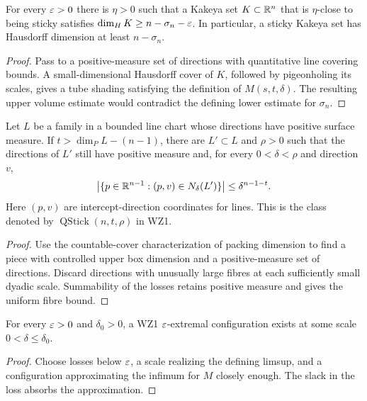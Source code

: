 \begin{proposition}
\label{prop:wz1-dimension-reduction}
For every $\varepsilon>0$ there is $\eta>0$ such that a Kakeya set
$K\subset\mathbb{R}^n$ that is $\eta$-close to being sticky satisfies
$\dim_H K\geq n-\sigma_n-\varepsilon$. In particular, a sticky Kakeya set
has Hausdorff dimension at least $n-\sigma_n$.
\end{proposition}
\begin{proof}
Pass to a positive-measure set of directions with quantitative line
covering bounds. A small-dimensional Hausdorff cover of $K$, followed
by pigeonholing its scales, gives a tube shading satisfying the
definition of $M(s,t,\delta)$. The resulting upper volume estimate
would contradict the defining lower estimate for $\sigma_n$.
\end{proof}

\begin{lemma}
\label{lem:packing-to-stickiness}
Let $L$ be a family in a bounded line chart whose directions have
positive surface measure. If $t>\dim_P L-(n-1)$, there are
$L'\subset L$ and $\rho>0$ such that the directions of $L'$ still
have positive measure and, for every $0<\delta<\rho$ and direction
$v$,
\[
 \left|\{p\in\mathbb{R}^{n-1}:(p,v)\in N_\delta(L')\}\right|
                                     \leq\delta^{n-1-t}.
\]
Here $(p,v)$ are intercept-direction coordinates for lines. This is
the class denoted by $\operatorname{QStick}(n,t,\rho)$ in WZ1.
\end{lemma}
\begin{proof}
Use the countable-cover characterization of packing dimension to find
a piece with controlled upper box dimension and a positive-measure
set of directions. Discard directions with unusually large fibres
at each sufficiently small dyadic scale. Summability of the losses
retains positive measure and gives the uniform fibre bound.
\end{proof}

\begin{lemma}
\label{lem:wz1-extremizers}
For every $\varepsilon>0$ and $\delta_0>0$, a WZ1 $\varepsilon$-extremal
configuration exists at some scale $0<\delta\leq\delta_0$.
\end{lemma}
\begin{proof}
Choose losses below $\varepsilon$, a scale realizing the defining limsup,
and a configuration approximating the infimum for $M$ closely enough.
The slack in the loss absorbs the approximation.
\end{proof}

